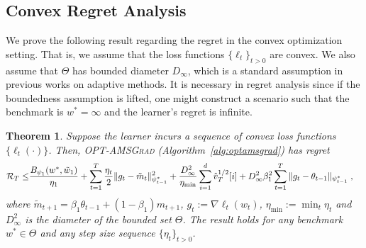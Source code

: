 \documentclass[11pt]{article}
\newtheorem{Theorem}{Theorem}
\theoremstyle{k}
\begin{document}
\subsection{Convex Regret Analysis}
We prove the following result regarding the regret in the convex optimization setting. That is, we assume that the loss functions $\{\ell_t\}_{t>0}$ are convex. We also assume that $\Theta$ has bounded diameter $D_{\infty}$, which is a standard assumption in previous works \citep{RKK18,KB15} on adaptive methods. It is necessary in regret analysis since if the boundedness assumption is lifted, one might construct a scenario such that the benchmark is $w^* = \infty$ and the learner's regret is infinite. 
\begin{Theorem} \label{thm:mainconvex}
Suppose the learner incurs a sequence of convex loss functions $\{ \ell_{t}(\cdot) \}$.
Then,  \textsc{OPT-AMSGrad} (Algorithm~\ref{alg:optamsgrad}) has regret 
\begin{equation} \label{bound:optadabeta}
\begin{aligned}
\mathcal{R}_T \leq &   \frac{ B_{\psi_1}(w^*, \tilde{w}_{1})}{\eta_1}
+ \sum_{t=1}^T\frac{\eta_t}{2} \| g_t - \tilde{m}_t  \|_{\psi_{t-1}^*}^2  + \frac{D_{\infty}^2}{\eta_{\min}}  \sum_{i=1}^d \hat{v}_{T}^{1/2}[i] + D_{\infty}^2\beta_1^2   \sum_{t=1}^T  \| g_t - \theta_{t-1}  \|_{\psi_{t-1}^*}\;,
\end{aligned}
\end{equation}
where $ \tilde{m}_{t+1}  = \beta_1 \theta_{t-1} +(1-\beta_1) m_{t+1}$, $g_{t}:= \nabla \ell_{t}(w_t)$, $\eta_{{\min}} := \min_{{t}} \eta_{t}$ and $D_{\infty}^2$ is the diameter of the bounded set $\Theta$.
The result holds for any benchmark $w^{*} \in \Theta$ and any step size sequence $\{ \eta_t \}_{t>0}$.
\end{Theorem}
\end{document}
